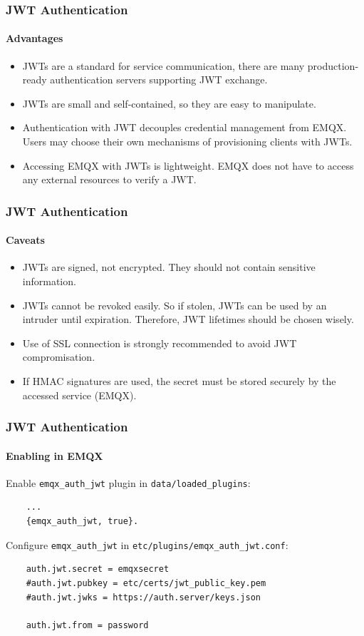 \documentclass{beamer}
\begin{document}
\begin{frame}
    \frametitle{JWT Authentication}
    \framesubtitle{Advantages}

    \begin{itemize}
        \item JWTs are a standard for service communication, there are many production-ready authentication servers supporting JWT exchange.
        \item JWTs are small and self-contained, so they are easy to manipulate.
        \item Authentication with JWT decouples credential management from EMQX. Users may choose their own mechanisms of provisioning clients with JWTs.
        \item Accessing EMQX with JWTs is lightweight. EMQX does not have to access any external resources to verify a JWT.
    \end{itemize}
\end{frame}

\begin{frame}
    \frametitle{JWT Authentication}
    \framesubtitle{Caveats}

    \begin{itemize}
        \item JWTs are signed, not encrypted. They should not contain sensitive information.
        \item JWTs cannot be revoked easily. So if stolen, JWTs can be used by an intruder until expiration. Therefore, JWT lifetimes should be chosen wisely.
        \item Use of SSL connection is strongly recommended to avoid JWT compromisation.
        \item If HMAC signatures are used, the secret must be stored securely by the accessed service (EMQX).
    \end{itemize}
\end{frame}

\begin{frame}[fragile]
    \frametitle{JWT Authentication}
    \framesubtitle{Enabling in EMQX}

    Enable \lstinline{emqx_auth_jwt} plugin in \lstinline{data/loaded_plugins}:
    \begin{lstlisting}
    ...
    {emqx_auth_jwt, true}.
    \end{lstlisting}
    Configure \lstinline{emqx_auth_jwt} in \lstinline{etc/plugins/emqx_auth_jwt.conf}:
    \begin{lstlisting}
    auth.jwt.secret = emqxsecret
    #auth.jwt.pubkey = etc/certs/jwt_public_key.pem
    #auth.jwt.jwks = https://auth.server/keys.json

    auth.jwt.from = password
    \end{lstlisting}
\end{frame}
\end{document}
